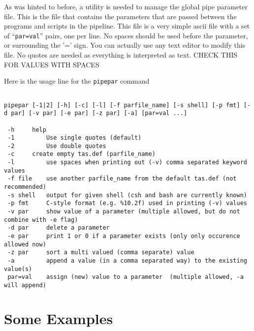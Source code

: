 \documentclass[preprint]{aastex} %
\begin{document}
As was hinted to before, a utility is needed to manage the global
pipe parameter file. This is the file that contains the parameters
that are passed between the programs and scripts
in the pipeline. This file is a very simple ascii file with a
set of ``{\tt par=val}''
pairs, one per line. No spaces should be used before the parameter,
or surrounding the '=' sign. 
You can actually use any text editor to modify this file.
No quotes are needed as everything is interpreted as text.  
CHECK THIS FOR VALUES WITH SPACES

Here is the usage line for the {\tt pipepar} command
\footnotesize
\begin{verbatim}

pipepar [-1|2] [-h] [-c] [-l] [-f parfile_name] [-s shell] [-p fmt] [-d par] [-v par] [-e par] [-z par] [-a] [par=val ...]

 -h	    help
 -1         Use single quotes (default)
 -2         Use double quotes
 -c	    create empty tas.def (parfile_name)
 -l         use spaces when printing out (-v) comma separated keyword values
 -f file    use another parfile_name from the default tas.def (not recommended)
 -s shell   output for given shell (csh and bash are currently known)
 -p fmt     C-style format (e.g. %10.2f) used in printing (-v) values
 -v par	    show value of a parameter (multiple allowed, but do not combine with -e flag)
 -d par     delete a parameter
 -e par     print 1 or 0 if a parameter exists (only only occurence allowed now)
 -z par     sort a multi valued (comma separate) value
 -a         append a value (in a comma separated way) to the existing value(s)
 par=val    assign (new) value to a parameter  (multiple allowed, -a will append)  

\end{verbatim}
\normalsize



\section{Some Examples}
\end{document}

